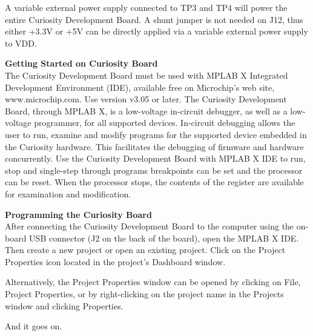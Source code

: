 A variable external power supply connected to TP3 and TP4 will power the entire Curiosity Development Board. A shunt jumper is not needed on J12, thus either +3.3V or +5V can be directly applied via a variable external power supply to VDD.
\vspace{0.5cm}


\textbf{Getting Started on Curiosity Board}\\

The Curiosity Development Board must be used with MPLAB X Integrated Development Environment (IDE), available free on Microchip's web site, www.microchip.com. Use version v3.05 or later. The Curiosity Development Board, through MPLAB X, is a low-voltage in-circuit debugger, as well as a low-voltage programmer, for all supported devices. In-circuit debugging allows the user to run, examine and modify programs for the supported device embedded in the Curiosity hardware. This facilitates
the debugging of firmware and hardware concurrently. Use the Curiosity Development Board with MPLAB X IDE to run, stop and single-step through programs breakpoints can be set and the processor can be reset. When the processor stops, the contents of the register are available for examination and modification.
\vspace{0.5cm}

\textbf{Programming the Curiosity Board}\\

After connecting the Curiosity Development Board to the computer using the on-board USB connector (J2 on the back of the board), open the MPLAB X IDE. Then create a new project or open an existing project. Click on the Project Properties icon located in the project's Dashboard window.
\vspace{0.5cm}

Alternatively, the Project Properties window can be opened by clicking on File, Project Properties, or by right-clicking on 
the project name in the Projects window and clicking Properties.
\vspace{0.5cm}

And it goes on.

